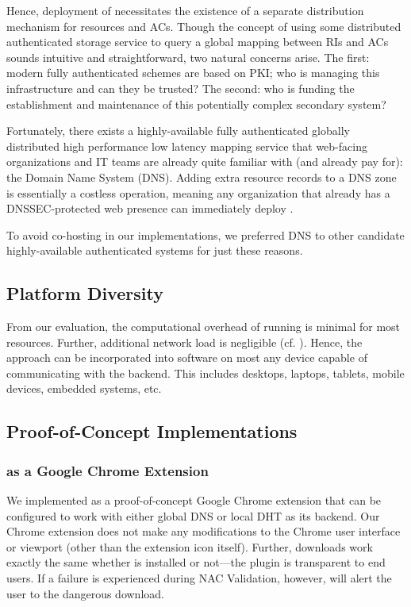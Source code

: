 Hence, deployment of \SYSTEM{} necessitates the existence of a separate
distribution mechanism for resources and ACs. Though the concept of using some
distributed authenticated storage service to query a global mapping between RIs
and ACs sounds intuitive and straightforward, two natural concerns arise. The
first: modern fully authenticated schemes are based on PKI; who is managing
this infrastructure and can they be trusted? The second: who is funding the
establishment and maintenance of this potentially complex secondary system?

Fortunately, there exists a highly-available fully authenticated globally
distributed high performance low latency mapping service that web-facing
organizations and IT teams are already quite familiar with (and already pay
for): the Domain Name System (DNS). Adding extra resource records to a DNS zone
is essentially a costless operation, meaning any organization that already has a
DNSSEC-protected web presence can immediately deploy \SYSTEM{}.

To avoid co-hosting in our implementations, we preferred DNS to other candidate
highly-available authenticated systems for just these reasons.

\subsection{Platform Diversity}

From our evaluation, the computational overhead of running \SYSTEM{} is minimal
for most resources. Further, additional network load is negligible (cf.
). Hence, the \SYSTEM{} approach can be incorporated into
software on most any device capable of communicating with the backend. This
includes desktops, laptops, tablets, mobile devices, embedded systems, etc.

\subsection{Proof-of-Concept Implementations}

\subsubsection{\SYSTEM{} as a Google Chrome Extension}

We implemented \SYSTEM{} as a proof-of-concept Google Chrome extension that can
be configured to work with either global DNS or local DHT as its backend. Our
Chrome extension does not make any modifications to the Chrome user interface or
viewport (other than the extension icon itself). Further, downloads work exactly
the same whether \SYSTEM{} is installed or not---the plugin is transparent to
end users. If a failure is experienced during NAC Validation, however, \SYSTEM{}
will alert the user to the dangerous download.

